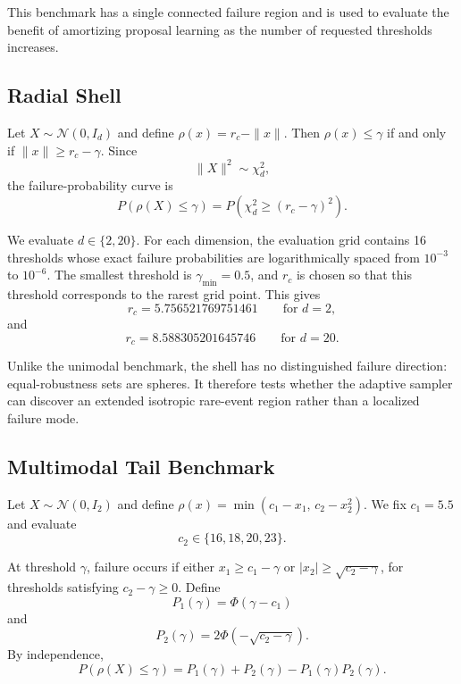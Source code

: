 This benchmark has a single connected failure region and is used to evaluate the benefit of amortizing proposal learning as the number of requested thresholds increases.

\subsection{Radial Shell}
\label{app:shell}

Let $X\sim\mathcal N(0,I_d)$ and define $\rho(x)=r_c-\|x\|.$ Then $\rho(x)\leq\gamma$ if and only if $\|x\|\geq r_c-\gamma.$ Since
\[
    \|X\|^2\sim\chi_d^2,
\]
the failure-probability curve is
\[
    P(\rho(X)\leq\gamma)
    =
    P\!\left(
        \chi_d^2
        \geq
        (r_c-\gamma)^2
    \right).
\]

We evaluate $d\in\{2,20\}$. For each dimension, the evaluation grid contains 16 thresholds whose exact failure probabilities are logarithmically spaced from $10^{-3}$ to $10^{-6}$. The smallest threshold is $\gamma_{\min}=0.5$, and $r_c$ is chosen so that this threshold corresponds to the rarest grid point. This gives
\[
    r_c
    =
    5.756521769751461
    \qquad
    \text{for }d=2,
\]
and
\[
    r_c
    =
    8.588305201645746
    \qquad
    \text{for }d=20.
\]

Unlike the unimodal benchmark, the shell has no distinguished failure direction: equal-robustness sets are spheres. It therefore tests whether the adaptive sampler can discover an extended isotropic rare-event region rather than a localized failure mode.

\subsection{Multimodal Tail Benchmark}
\label{app:tail-race}

Let $X\sim\mathcal N(0,I_2)$ and define
\(
    \rho(x)
    =
    \min\!\left(
        c_1-x_1,\,
        c_2-x_2^2
    \right).
\)
We fix $c_1=5.5$ and evaluate \[c_2\in\{16,18,20,23\}.\]

At threshold $\gamma$, failure occurs if either $x_1\geq c_1-\gamma$ or $|x_2|\geq\sqrt{c_2-\gamma}$, for thresholds satisfying $c_2-\gamma\geq0$. Define
\[
    P_1(\gamma)
    =
    \Phi(\gamma-c_1)
\]
and
\[
    P_2(\gamma)
    =
    2\Phi\!\left(
        -\sqrt{c_2-\gamma}
    \right).
\]
By independence,
\[
    P(\rho(X)\leq\gamma)
    =
    P_1(\gamma)
    +
    P_2(\gamma)
    -
    P_1(\gamma)P_2(\gamma).
\]

